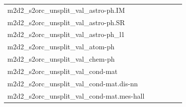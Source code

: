 \documentclass[dvipsnames]{article}
\begin{document}
\begin{appendix}
{\begin{longtable}{m{6cm}m{1.7cm}m{1.7cm}m{1.7cm}m{1.7cm}m{1.7cm}}
	m2d2\_s2orc\_unsplit\_val\_astro-ph.IM  & \colorbox[HTML]{ecf7b1}{\makebox[\mywidth][c]{15.36}} & \colorbox[HTML]{e8f6ae}{\makebox[\mywidth][c]{15.33}} & \colorbox[HTML]{ffffe5}{\makebox[\mywidth][c]{17.16}} & \colorbox[HTML]{d9f0a3}{\makebox[\mywidth][c]{15.21}} & \colorbox[HTML]{77c578}{\makebox[\mywidth][c]{14.92}}\\
	m2d2\_s2orc\_unsplit\_val\_astro-ph.SR  & \colorbox[HTML]{e7f5ad}{\makebox[\mywidth][c]{13.08}} & \colorbox[HTML]{e6f5ad}{\makebox[\mywidth][c]{13.08}} & \colorbox[HTML]{ffffe5}{\makebox[\mywidth][c]{14.89}} & \colorbox[HTML]{b8e293}{\makebox[\mywidth][c]{12.86}} & \colorbox[HTML]{77c578}{\makebox[\mywidth][c]{12.70}}\\
	m2d2\_s2orc\_unsplit\_val\_astro-ph\_l1  & \colorbox[HTML]{ecf7b1}{\makebox[\mywidth][c]{15.36}} & \colorbox[HTML]{e8f6ae}{\makebox[\mywidth][c]{15.33}} & \colorbox[HTML]{ffffe5}{\makebox[\mywidth][c]{17.16}} & \colorbox[HTML]{d9f0a3}{\makebox[\mywidth][c]{15.21}} & \colorbox[HTML]{77c578}{\makebox[\mywidth][c]{14.92}}\\
	m2d2\_s2orc\_unsplit\_val\_atom-ph  & \colorbox[HTML]{d0ec9e}{\makebox[\mywidth][c]{12.74}} & \colorbox[HTML]{e3f4aa}{\makebox[\mywidth][c]{12.84}} & \colorbox[HTML]{ffffe5}{\makebox[\mywidth][c]{14.44}} & \colorbox[HTML]{d1ec9f}{\makebox[\mywidth][c]{12.75}} & \colorbox[HTML]{77c578}{\makebox[\mywidth][c]{12.53}}\\
	m2d2\_s2orc\_unsplit\_val\_chem-ph  & \colorbox[HTML]{ccea9c}{\makebox[\mywidth][c]{13.20}} & \colorbox[HTML]{ddf1a6}{\makebox[\mywidth][c]{13.29}} & \colorbox[HTML]{ffffe5}{\makebox[\mywidth][c]{15.22}} & \colorbox[HTML]{bde395}{\makebox[\mywidth][c]{13.14}} & \colorbox[HTML]{77c578}{\makebox[\mywidth][c]{12.97}}\\
	m2d2\_s2orc\_unsplit\_val\_cond-mat  & \colorbox[HTML]{c6e89a}{\makebox[\mywidth][c]{11.67}} & \colorbox[HTML]{e1f3a9}{\makebox[\mywidth][c]{11.78}} & \colorbox[HTML]{ffffe5}{\makebox[\mywidth][c]{13.37}} & \colorbox[HTML]{c3e698}{\makebox[\mywidth][c]{11.67}} & \colorbox[HTML]{77c578}{\makebox[\mywidth][c]{11.50}}\\
	m2d2\_s2orc\_unsplit\_val\_cond-mat.dis-nn  & \colorbox[HTML]{bfe596}{\makebox[\mywidth][c]{12.54}} & \colorbox[HTML]{e1f3a9}{\makebox[\mywidth][c]{12.67}} & \colorbox[HTML]{ffffe5}{\makebox[\mywidth][c]{14.28}} & \colorbox[HTML]{ccea9c}{\makebox[\mywidth][c]{12.58}} & \colorbox[HTML]{77c578}{\makebox[\mywidth][c]{12.38}}\\
	m2d2\_s2orc\_unsplit\_val\_cond-mat.mes-hall  & \colorbox[HTML]{b3df91}{\makebox[\mywidth][c]{11.24}} & \colorbox[HTML]{ebf7b0}{\makebox[\mywidth][c]{11.50}} & \colorbox[HTML]{ffffe5}{\makebox[\mywidth][c]{13.19}} & \colorbox[HTML]{c6e89a}{\makebox[\mywidth][c]{11.30}} & \colorbox[HTML]{77c578}{\makebox[\mywidth][c]{11.10}}\\

\end{longtable}}
\end{appendix}
\end{document}
